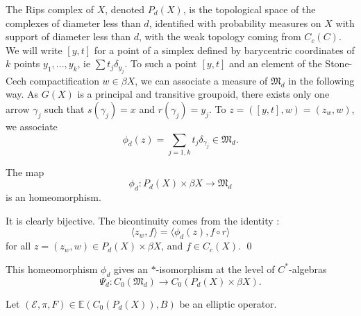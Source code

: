 The Rips complex of $X$, denoted $P_d(X)$, is the topological space of the complexes of diameter less than $d$, identified with probability measures on $X$ with support of diameter less than $d$, with the weak topology coming from $C_c(C)$. We will write $[y,t]$ for a point of a simplex defined by barycentric coordinates of $k$ points $y_1,...,y_k$, ie $\sum t_j \delta_{y_j}$. To such a point $[y,t]$ and an element of the Stone-Cech compactification $w\in \beta X$, we can associate a measure of $\mathfrak M_d$ in the following way. As $G(X)$ is a principal and transitive groupoid, there exists only one arrow $\gamma_j$ such that $s(\gamma_j)=x$ and $r(\gamma_j)=y_j$. To $z=([y,t],w)=(z_w,w)$, we associate 
\[\phi_d(z)=\sum_{j=1,k} t_j \delta_{\gamma_j}\in\mathfrak M_d.\]

\begin{prop}
The map
\[\phi_d: P_d(X)\times \beta X \rightarrow \mathfrak M_d\]
is an homeomorphism.
\end{prop}
\begin{dem}
It is clearly bijective. The bicontinuity comes from the identity :
\[\langle z_w,f\rangle=\langle \phi_d(z),f\circ r\rangle\]
for all $z=(z_w,w)\in P_d(X)\times \beta X$, and $f\in C_c(X)$.
\qed
\end{dem}

This homeomorphism $\phi_d$ gives an $*$-isomorphism at the level of $C^*$-algebras
\[\Psi_d : C_0(\mathfrak M_d)\rightarrow C_0(P_d(X)\times \beta X).\]

Let $(\mathcal E, \pi, F)\in \mathbb E(C_0(P_d(X)),B)$ be an elliptic operator. 
